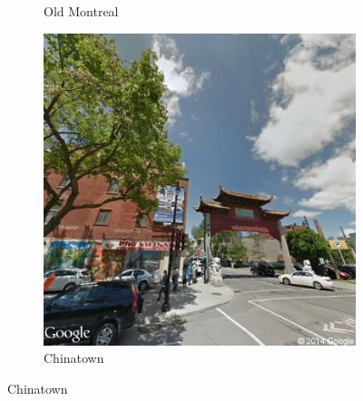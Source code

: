 \documentclass{acm_proc_article-sp}
\begin{document}
\begin{figure}[h!]
\begin{subfigure}[b]{0.3\linewidth}
		\caption{Old Montreal}
		\label{fig:oldmontreal}
	\end{subfigure}
	\begin{subfigure}[b]{0.3\linewidth}
		\includegraphics[width=\linewidth]{chinatown.png}
		\caption{Chinatown}
		\label{fig:chinatown}
	\end{subfigure}


\end{figure}
\end{document}
